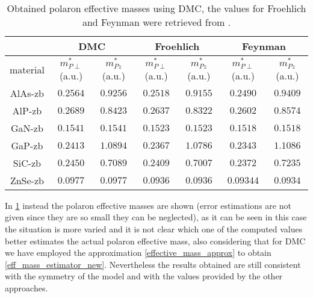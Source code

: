\begin{table}[H]
    \centering
    \begin{tabular}{|c|c|c|c|c|c|c|}
        \hline
        \hline
         & \multicolumn{2}{|c|}{DMC} & \multicolumn{2}{|c|}{Froehlich} & \multicolumn{2}{|c|}{Feynman} \\
        \hline
        \hline
        material & $m^*_{P\perp}$ (a.u.) & $m^*_{Pz}$ (a.u.) & $m^*_{P\perp}$ (a.u.) & $m^*_{Pz}$ (a.u.) & $m^*_{P\perp}$ (a.u.) & $m^*_{Pz}$ (a.u.) \\
        \hline
        AlAs-zb & $0.2564$ & $0.9256$ & $0.2518$ & $0.9155$ & $0.2490$ & $0.9409$ \\
        AlP-zb & $0.2689$ & $0.8423$ & $0.2637$ & $0.8322$ & $0.2602$ & $0.8574$ \\
        GaN-zb & $0.1541$ & $0.1541$ & $0.1523$ & $0.1523$ & $0.1518$ & $0.1518$ \\
        GaP-zb & $0.2413$ & $1.0894$ & $0.2367$ & $1.0786$ & $0.2343$ & $1.1086$ \\
        SiC-zb & $0.2450$ & $0.7089$ & $0.2409$ & $0.7007$ & $0.2372$ & $0.7235$ \\
        ZnSe-zb & $0.0977$ & $0.0977$ & $0.0936$ & $0.0936$ & $0.09344$ & $0.0934$ \\
        \hline
    \end{tabular}
    \caption{Obtained polaron effective masses using DMC, the values for Froehlich and Feynman were retrieved from \cite{guster2021frohlich}.}
    \label{tab:eff_mass_polarons}
\end{table}
In \ref{tab:eff_mass_polarons} instead the polaron effective masses are shown (error estimations are not given since they are so small they can be neglected), as it can be seen 
in this case the situation is more varied and it is not clear which one of the computed values better estimates the actual polaron effective mass, 
also considering that for DMC we have employed the approximation \ref{effective_mass_approx} to obtain \ref{eff_mass_estimator_new}. Nevertheless the results obtained are still consistent 
with the symmetry of the model and with the values provided by the other approaches.




